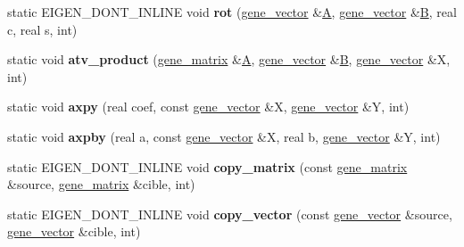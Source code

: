 \begin{DoxyCompactItemize}
static E\+I\+G\+E\+N\+\_\+\+D\+O\+N\+T\+\_\+\+I\+N\+L\+I\+NE void {\bfseries rot} (\hyperlink{group___core___module_class_eigen_1_1_matrix}{gene\+\_\+vector} \&\hyperlink{group___core___module_class_eigen_1_1_matrix}{A}, \hyperlink{group___core___module_class_eigen_1_1_matrix}{gene\+\_\+vector} \&\hyperlink{group___core___module_class_eigen_1_1_matrix}{B}, real c, real s, int)
\item 
\mbox{\label{classeigen3__interface_aad51fe2780f6070ea2abc59062c59dbd}} 
static void {\bfseries atv\+\_\+product} (\hyperlink{group___core___module_class_eigen_1_1_matrix}{gene\+\_\+matrix} \&\hyperlink{group___core___module_class_eigen_1_1_matrix}{A}, \hyperlink{group___core___module_class_eigen_1_1_matrix}{gene\+\_\+vector} \&\hyperlink{group___core___module_class_eigen_1_1_matrix}{B}, \hyperlink{group___core___module_class_eigen_1_1_matrix}{gene\+\_\+vector} \&X, int)
\item 
\mbox{\label{classeigen3__interface_afc30971485ac0aafb6480ff971e37b19}} 
static void {\bfseries axpy} (real coef, const \hyperlink{group___core___module_class_eigen_1_1_matrix}{gene\+\_\+vector} \&X, \hyperlink{group___core___module_class_eigen_1_1_matrix}{gene\+\_\+vector} \&Y, int)
\item 
\mbox{\label{classeigen3__interface_a3424dac789f77fb487f69930f9efde11}} 
static void {\bfseries axpby} (real a, const \hyperlink{group___core___module_class_eigen_1_1_matrix}{gene\+\_\+vector} \&X, real b, \hyperlink{group___core___module_class_eigen_1_1_matrix}{gene\+\_\+vector} \&Y, int)
\item 
\mbox{\label{classeigen3__interface_a8a3c0694dd89ae269aa3f42495f03929}} 
static E\+I\+G\+E\+N\+\_\+\+D\+O\+N\+T\+\_\+\+I\+N\+L\+I\+NE void {\bfseries copy\+\_\+matrix} (const \hyperlink{group___core___module_class_eigen_1_1_matrix}{gene\+\_\+matrix} \&source, \hyperlink{group___core___module_class_eigen_1_1_matrix}{gene\+\_\+matrix} \&cible, int)
\item 
\mbox{\label{classeigen3__interface_a2d8729cf5829bc05b71c67c6d9abe03a}} 
static E\+I\+G\+E\+N\+\_\+\+D\+O\+N\+T\+\_\+\+I\+N\+L\+I\+NE void {\bfseries copy\+\_\+vector} (const \hyperlink{group___core___module_class_eigen_1_1_matrix}{gene\+\_\+vector} \&source, \hyperlink{group___core___module_class_eigen_1_1_matrix}{gene\+\_\+vector} \&cible, int)

\end{DoxyCompactItemize}
